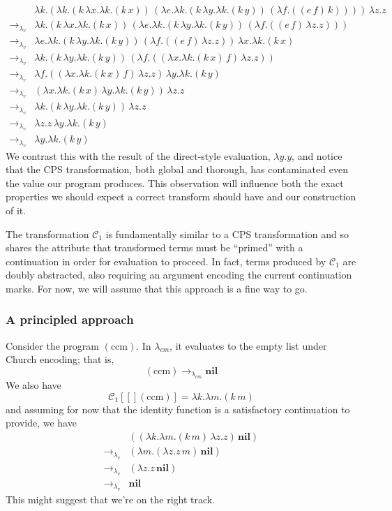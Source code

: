 \documentclass[ms,electronic,twosidetoc,letterpaper,chaptercenter,parttop]{byumsphd}
\newcommand{\cmrr}{\rightarrow_{\lambda_{cm}}}
\newcommand{\Cone}[1]{\mathcal{C}_1[#1]}
\newcommand{\ccm}{(\mathrm{ccm})}
\begin{document}
\begin{align*}
            &\lambda k.(\lambda k.(k\,\lambda x.\lambda k.(k\,x))\,(\lambda e.\lambda k.(k\,\lambda y.\lambda k.(k\,y))\,(\lambda f.((e\,f)\,k))))\,\lambda z.z\\
\rightarrow_{\lambda_{v}} &\lambda k.(k\,\lambda x.\lambda k.(k\,x))\,(\lambda e.\lambda k.(k\,\lambda y.\lambda k.(k\,y))\,(\lambda f.((e\,f)\,\lambda z.z)))\\
\rightarrow_{\lambda_{v}} &\lambda e.\lambda k.(k\,\lambda y.\lambda k.(k\,y))\,(\lambda f.((e\,f)\,\lambda z.z))\,\lambda x.\lambda k.(k\,x)\\
\rightarrow_{\lambda_{v}} &\lambda k.(k\,\lambda y.\lambda k.(k\,y))\,(\lambda f.((\lambda x.\lambda k.(k\,x)\,f)\,\lambda z.z))\\
\rightarrow_{\lambda_{v}} &\lambda f.((\lambda x.\lambda k.(k\,x)\,f)\,\lambda z.z)\,\lambda y.\lambda k.(k\,y)\\
\rightarrow_{\lambda_{v}} &(\lambda x.\lambda k.(k\,x)\,\lambda y.\lambda k.(k\,y))\,\lambda z.z\\
\rightarrow_{\lambda_{v}} &\lambda k.(k\,\lambda y.\lambda k.(k\,y))\,\lambda z.z\\
\rightarrow_{\lambda_{v}} &\lambda z.z\,\lambda y.\lambda k.(k\,y)\\
\rightarrow_{\lambda_{v}} &\lambda y.\lambda k.(k\,y)
\end{align*}
We contrast this with the result of the direct-style evaluation, $\lambda y.y$, and notice 
that the CPS transformation, both global and thorough, has contaminated even the value our 
program produces. This observation will influence both the exact properties we should 
expect a correct transform should have and our construction of it.


The transformation $\mathcal{C}_{1}$ is fundamentally similar to a CPS transformation and 
so shares the attribute that transformed terms must be ``primed'' with a continuation in 
order for evaluation to proceed. In fact, terms produced by $\mathcal{C}_{1}$ are doubly 
abstracted, also requiring an argument encoding the current continuation marks. For now, 
we will assume that this approach is a fine way to go.

\subsubsection{A principled approach}

Consider the program $\ccm$. In $\lambda_{cm}$, it evaluates to the empty list under 
Church encoding; that is,
\[
\ccm\cmrr \mathbf{nil}
\]
We also have
\[
\Cone[\ccm]=\lambda k.\lambda m.(k\,m)
\]
and assuming for now that the identity function is a satisfactory continuation to provide, 
we have
\begin{align*}
                          &((\lambda k.\lambda m.(k\,m)\,\lambda z.z)\,\mathbf{nil})\\
\rightarrow_{\lambda_{v}} &(\lambda m.(\lambda z.z\,m)\,\mathbf{nil})\\
\rightarrow_{\lambda_{v}} &(\lambda z.z\,\mathbf{nil})\\
\rightarrow_{\lambda_{v}} &\mathbf{nil}
\end{align*}
This might suggest that we're on the right track.
\end{document}

